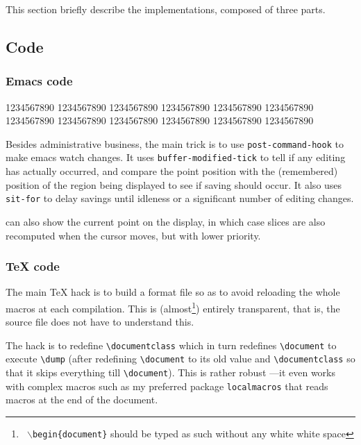 \documentclass{article}
\let \lst \verb
\let \whizzy \WhizzyTeX
\begin{document}
This section briefly describe the implementations, composed of three parts.

\subsection {Code} 

\subsubsection* {Emacs code}

1234567890
1234567890
1234567890
1234567890
1234567890
1234567890
1234567890
1234567890
1234567890
1234567890
1234567890
1234567890

Besides administrative business, the main trick is to use 
\lst"post-command-hook" to make emacs watch changes. 
It uses \lst"buffer-modified-tick" to tell if any editing has actually
occurred, and compare the point position with the (remembered) position of
the region being displayed to see if saving should occur. It also uses
\lst"sit-for" to delay savings until idleness or a 
significant number of editing changes. 

{\whizzy} can also show the current point on the display, in which case
slices are also recomputed when the cursor moves, but with lower priority.

\subsubsection* {TeX code}

The main TeX hack is to build a format file so as to avoid reloading the
whole macros at each compilation. This is (almost\footnote{{\tt
$\backslash$begin\{document\}} should be typed as such without any white
white space}) entirely transparent, that is, the source file does not have
to understand this.

The hack is to redefine \lst"\documentclass" which in turn  redefines
\lst"\document" to execute \lst"\dump" (after redefining \lst"\document"
to its old value and \lst"\documentclass" so that it skips everything till
\lst"\document"). This is rather robust ---it even works with 
complex macros such as my preferred package \lst"localmacros" that reads
macros at the end of the document.
\end{document}
